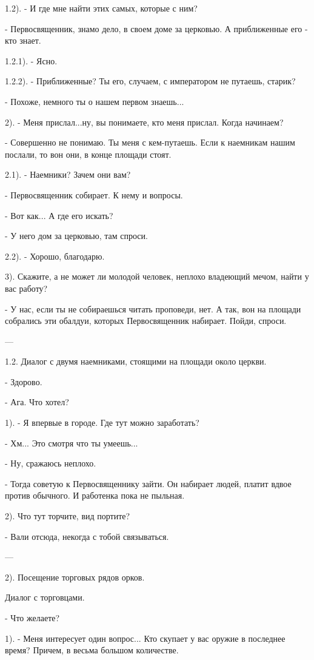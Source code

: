 \documentclass[12pt,a4paper]{book}
\begin{document}
1.2). - И где мне найти этих самых, которые с ним?

- Первосвященник, знамо дело, в своем доме за церковью. А приближенные его - кто знает.

1.2.1). - Ясно.

1.2.2). - Приближенные? Ты его, случаем, с императором не путаешь, старик?

- Похоже, немного ты о нашем первом знаешь... 

2). - Меня прислал...ну, вы понимаете, кто меня прислал. Когда начинаем?

- Совершенно не понимаю. Ты меня с кем-путаешь. Если к наемникам нашим послали, то вон они, в конце площади стоят.

2.1). - Наемники? Зачем они вам?

- Первосвященник собирает. К нему и вопросы.

- Вот как... А где его искать?

- У него дом за церковью, там спроси.

2.2). - Хорошо, благодарю.

3). Скажите, а не может ли молодой человек, неплохо владеющий мечом, найти у вас работу?

- У нас, если ты не собираешься читать проповеди, нет. А так, вон на площади собрались эти обалдуи, которых Первосвященник набирает. Пойди, спроси. 

---

1.2. Диалог с двумя наемниками, стоящими на площади около церкви.

- Здорово.

- Ага. Что хотел?

1). - Я впервые в городе. Где тут можно заработать?

- Хм... Это смотря что ты умеешь...

- Ну, сражаюсь неплохо.

- Тогда советую к Первосвященнику зайти. Он набирает людей, платит вдвое против обычного. И работенка пока не пыльная.

2). Что тут торчите, вид портите?

- Вали отсюда, некогда с тобой связываться.

---

2). Посещение торговых рядов орков.

Диалог с торговцами.

- Что желаете?

1). - Меня интересует один вопрос... Кто скупает у вас оружие в последнее время? Причем, в весьма большом количестве.
\end{document}
